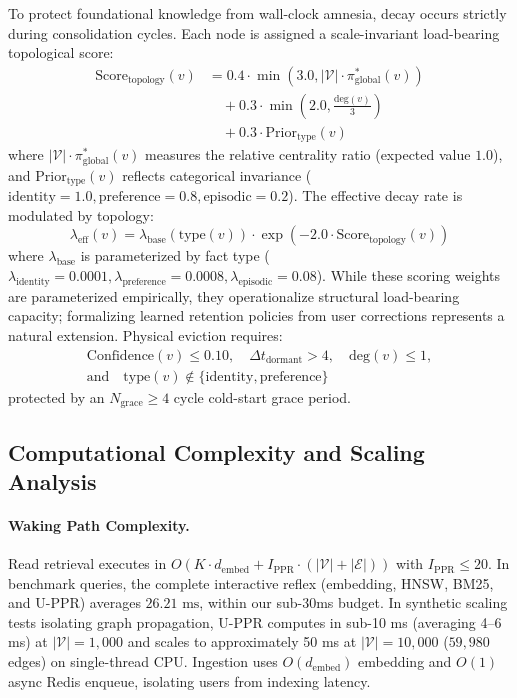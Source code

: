 \documentclass[conference]{IEEEtran}
\begin{document}
To protect foundational knowledge from wall-clock amnesia, decay occurs strictly during consolidation cycles. Each node is assigned a scale-invariant load-bearing topological score:
\begin{equation}
\begin{aligned}
\text{Score}_{\text{topology}}(v) &= 0.4 \cdot \min\left(3.0, |\mathcal{V}| \cdot \pi_{\text{global}}^*(v)\right) \\
&\quad + 0.3 \cdot \min\left(2.0, \frac{\text{deg}(v)}{3}\right) \\
&\quad + 0.3 \cdot \text{Prior}_{\text{type}}(v)
\end{aligned}
\end{equation}
where $|\mathcal{V}| \cdot \pi_{\text{global}}^*(v)$ measures the relative centrality ratio (expected value $1.0$), and $\text{Prior}_{\text{type}}(v)$ reflects categorical invariance ($\text{identity}=1.0, \text{preference}=0.8, \text{episodic}=0.2$). The effective decay rate is modulated by topology:
\begin{equation}
\lambda_{\text{eff}}(v) = \lambda_{\text{base}}(\text{type}(v)) \cdot \exp\left(-2.0 \cdot \text{Score}_{\text{topology}}(v)\right)
\end{equation}
where $\lambda_{\text{base}}$ is parameterized by fact type ($\lambda_{\text{identity}} = 0.0001, \lambda_{\text{preference}} = 0.0008, \lambda_{\text{episodic}} = 0.08$). While these scoring weights are parameterized empirically, they operationalize structural load-bearing capacity; formalizing learned retention policies from user corrections represents a natural extension. Physical eviction requires:
\begin{equation}
\begin{gathered}
\text{Confidence}(v) \le 0.10, \quad \Delta t_{\text{dormant}} > 4, \quad \text{deg}(v) \le 1, \\
\text{and} \quad \text{type}(v) \notin \{\text{identity}, \text{preference}\}
\end{gathered}
\end{equation}
protected by an $N_{\text{grace}} \ge 4$ cycle cold-start grace period.

\subsection{Computational Complexity and Scaling Analysis}
\paragraph{Waking Path Complexity.} Read retrieval executes in $O(K \cdot d_{\text{embed}} + I_{\text{PPR}} \cdot (|\mathcal{V}| + |\mathcal{E}|))$ with $I_{\text{PPR}} \le 20$. In benchmark queries, the complete interactive reflex (embedding, HNSW, BM25, and U-PPR) averages $26.21\text{ ms}$, within our sub-30ms budget. In synthetic scaling tests isolating graph propagation, U-PPR computes in sub-10 ms (averaging 4--6 ms) at $|\mathcal{V}| = 1{,}000$ and scales to approximately 50 ms at $|\mathcal{V}| = 10{,}000$ ($59{,}980$ edges) on single-thread CPU. Ingestion uses $O(d_{\text{embed}})$ embedding and $O(1)$ async Redis enqueue, isolating users from indexing latency.
\end{document}
